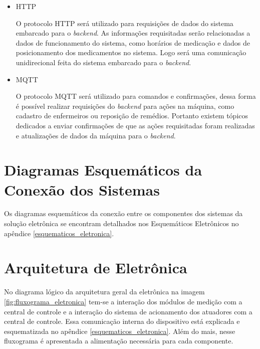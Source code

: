 \begin{itemize}
    \item HTTP
    
    O protocolo HTTP será utilizado para requisições de dados do sistema embarcado para o \textit{backend}. As informações requisitadas serão relacionadas a dados de funcionamento do sistema, como horários de medicação e dados de posicionamento dos medicamentos no sistema. Logo será uma comunicação unidirecional feita do sistema embarcado para o \textit{backend}.
    
    \item MQTT
    
    O protocolo MQTT será utilizado para comandos e confirmações, dessa forma é possível realizar requisições do \textit{backend} para ações na máquina, como cadastro de enfermeiros ou reposição de remédios. Portanto existem  tópicos dedicados a enviar confirmações de que as ações requisitadas foram realizadas e atualizações de dados da máquina para o \textit{backend}.
    
    
\end{itemize}

\section{Diagramas Esquemáticos da Conexão dos Sistemas}\label{sec:esq_conec_sistemas}

Os diagramas esquemáticos da conexão entre os componentes dos sistemas da solução eletrônica se encontram detalhados nos Esquemáticos Eletrônicos no apêndice \ref{esquematicos_eletronica}.

\section{Arquitetura de Eletrônica}

No diagrama lógico da arquitetura geral da eletrônica na imagem \ref{fig:fluxograma_eletronica} tem-se a interação dos módulos de medição com a central de controle e a interação do sistema de acionamento dos atuadores com a central de controle. Essa comunicação interna do dispositivo está explicada e esquematizada no apêndice \ref{esquematicos_eletronica}. Além do mais, nesse fluxograma é apresentada a alimentação necessária para cada componente.


